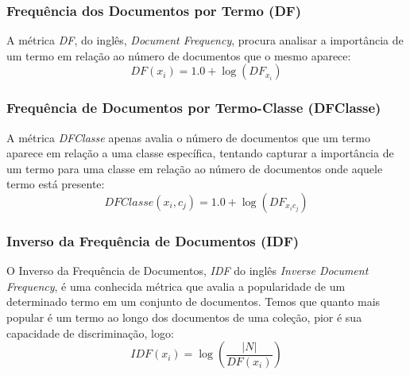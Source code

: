 \subsubsection{Frequência dos Documentos por Termo (DF)}
\label{subsubsection::df}

A métrica \textit{DF}, do inglês, \textit{Document Frequency}, procura analisar a importância de um termo em relação ao número de documentos que o mesmo aparece:
\begin{equation}\label{eqn::df}
   DF(x_i) = 1.0 + \log{ ( DF_{x_i} ) }
\end{equation}



\subsubsection{Frequência de Documentos por Termo-Classe (DFClasse)}
\label{subsubsection::sumdf}

A métrica \textit{DFClasse} apenas avalia o número de documentos que um termo aparece em relação a uma classe específica, tentando capturar a importância de um termo para uma classe em relação ao número de documentos onde aquele termo está presente:
\begin{equation}\label{eqn::sumtf}
   DFClasse(x_i,c_j) = 1.0 + \log{ ( DF_{x_ic_j} ) }
\end{equation}


\subsubsection{Inverso da Frequência de Documentos (IDF)}
\label{subsubsection::idf}

O Inverso da Frequência de Documentos, \textit{IDF} do inglês \textit{Inverse Document Frequency}, é uma conhecida métrica que avalia a popularidade de um determinado termo em um conjunto de documentos. Temos que quanto mais popular é um termo ao longo dos documentos de uma coleção, pior é sua capacidade de discriminação, logo:
\begin{equation}\label{eqn::tficf}
   IDF(x_i) = \log( \frac{|N|} {DF(x_i)} )
\end{equation}

